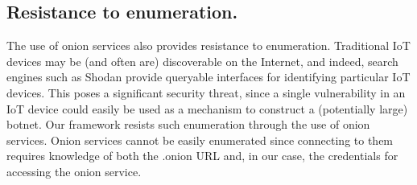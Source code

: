 \subsection{Resistance to enumeration.} The use of onion services also provides resistance to enumeration. Traditional IoT devices may be (and often are) discoverable on the Internet, and indeed, search engines such as Shodan \cite{matherly2015complete} provide queryable interfaces for identifying particular IoT devices. This poses a significant security threat, since a single vulnerability in an IoT device could easily be used as a mechanism to construct a (potentially large) botnet. Our framework resists such enumeration through the use of onion services. Onion services cannot be easily enumerated \cite{winter2018tor} \cite{chaabane2010digging} since connecting to them requires knowledge of both the .onion URL and, in our case, the credentials for accessing the onion service.